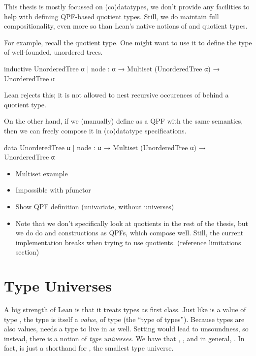 This thesis is mostly focussed on (co)datatypes, we don't provide any facilities to help with defining QPF-based quotient types. 
Still, we do maintain full compositionality, even more so than Lean's native notions of \inductive{} and quotient types.

For example, recall the  quotient type. One might want to use it to define the type of well-founded, unordered trees.
\begin{badleancode}
  inductive UnorderedTree α
  | node : α → Multiset (UnorderedTree α) → UnorderedTree α
\end{badleancode}

Lean rejects this; it is not allowed to nest recursive occurences of  behind a quotient type.

On the other hand, if we (manually) define  as a QPF with the same semantics, then we can freely compose it in (co)datatype specifications.
\begin{leancode}
  data UnorderedTree α
  | node : α → Multiset (UnorderedTree α) → UnorderedTree α
\end{leancode}


\begin{todo}
    \begin{itemize}
        \item Multiset example
        \item Impossible with pfunctor
        \item Show QPF definition (univariate, without universes)
        \item Note that we don't specifically look at quotients in the rest of the thesis, but we do do \data{} and \codata{} constructions as QPFs, which compose well. Still, the current implementation breaks when trying to use quotients. (reference limitations section)
    \end{itemize}
\end{todo}











\section{Type Universes}
\label{sec:bg:universes}

A big strength of Lean is that it treats types as first class. Just like  is a value of type , the type  is itself a \emph{value}, of type \Type{} (the ``type of types''). Because types are also values, \Type{} needs a type to live in as well. Setting  would lead to unsoundness, so instead, there is a notion of \emph{type universes}. We have that , , and in general, . In fact,  is just a shorthand for , the smallest type universe.

